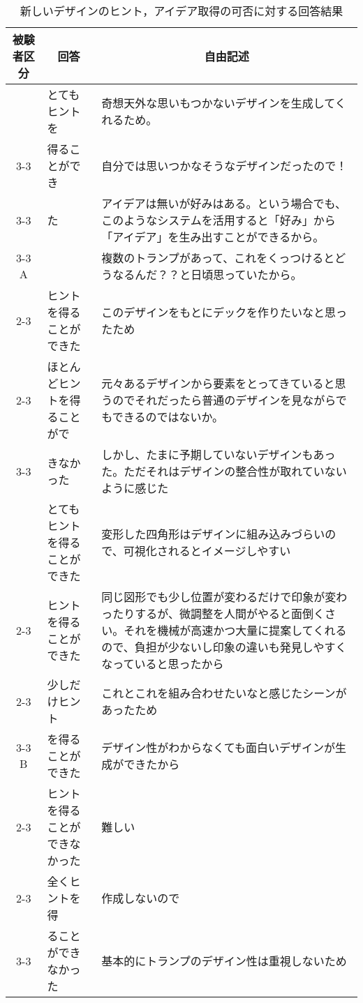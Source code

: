 \begin{table}[htbp]
    \centering
    \caption{新しいデザインのヒント，アイデア取得の可否に対する回答結果}
    \begin{tabular}{|c|p{7em}|p{26em}|} \hline
        被験者区分 & \multicolumn{1}{|c|}{回答} & \multicolumn{1}{|c|}{自由記述} \\ \hline
        & とてもヒントを &奇想天外な思いもつかないデザインを生成してくれるため。\\\cline{3-3}　
         & 得ることができ&自分では思いつかなそうなデザインだったので！ \\ \cline{3-3}
         & た&アイデアは無いが好みはある。という場合でも、このようなシステムを活用すると「好み」から「アイデア」を生み出すことができるから。\\\cline{3-3}
        A & & 複数のトランプがあって、これをくっつけるとどうなるんだ？？と日頃思っていたから。\\\cline{2-3}
         & ヒントを得ることができた&このデザインをもとにデックを作りたいなと思ったため　\\ \cline{2-3}
         &ほとんどヒントを得ることがで &元々あるデザインから要素をとってきていると思うのでそれだったら普通のデザインを見ながらでもできるのではないか。\\\cline{3-3} 
         &きなかった & しかし、たまに予期していないデザインもあった。ただそれはデザインの整合性が取れていないように感じた \\ \hline
        & とてもヒントを得ることができた& 変形した四角形はデザインに組み込みづらいので、可視化されるとイメージしやすい\\\cline{2-3}
         & ヒントを得ることができた& 同じ図形でも少し位置が変わるだけで印象が変わったりするが、微調整を人間がやると面倒くさい。それを機械が高速かつ大量に提案してくれるので、負担が少ないし印象の違いも発見しやすくなっていると思ったから\\ \cline{2-3}
         & 少しだけヒント & これとこれを組み合わせたいなと感じたシーンがあったため \\\cline{3-3}
        B & を得ることができた&デザイン性がわからなくても面白いデザインが生成ができたから\\\cline{2-3}
         & ヒントを得ることができなかった& 難しい　\\ \cline{2-3}
         & 全くヒントを得&作成しないので \\ \cline{3-3}
         & ることができなかった& 基本的にトランプのデザイン性は重視しないため\\\hline

    \end{tabular}
    \label{free2}
\end{table}

